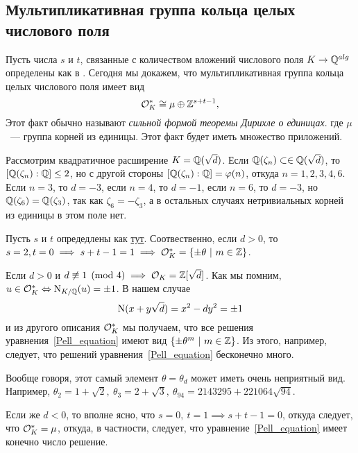 	
	\subsection{Мультипликативная группа кольца целых числового поля}

	Пусть числа $s$ и $t$, связанные с количеством вложений числового поля $K \to \mathbb{Q}^{alg}$ определены как в \hyperlink{real_and_complex_inclusions}{}. Сегодня мы докажем, что мультипликативная группа кольца целых числового поля имеет вид 
	\[
		\mathcal{O}_{K}^{*} \cong \mu \oplus \mathbb{Z}^{s + t - 1},
	\]
	Этот факт обычно называют \emph{сильной формой теоремы Дирихле о единицах}.
	где $\mu$~--- группа корней из единицы. Этот факт будет иметь множество приложений. 

	\begin{example}
		Рассмотрим квадратичное расширение $K = \mathbb{Q}(\sqrt{d})$. Если $\mathbb{Q}(\zeta_n) \subset \in \mathbb{Q}(\sqrt{d})$, то $[\mathbb{Q}(\zeta_n) : \mathbb{Q}] \le 2$, но с другой стороны $[\mathbb{Q}(\zeta_n) : \mathbb{Q}] = \varphi(n)$, откуда $n = 1, 2, 3, 4, 6$.  Если $n = 3$, то $d = -3$, если $n = 4$, то $d = -1$, если $n = 6$, то $d = -3$, но $\mathbb{Q}(\zeta_6) = \mathbb{Q}(\zeta_3)$, так как $\zeta_6 = -\zeta_3$, а в остальных случаях нетривиальных корней из единицы в этом поле нет. 

		Пусть $s$ и $t$ опредедлены как \hyperlink{real_and_complex_inclusions}{тут}. Соотвественно, если $d > 0$, то $s = 2, t = 0 \implies s + t - 1 = 1 \implies \mathcal{O}_{K}^{*} = \{ \pm \theta \ \vert \ m \in \mathbb{Z}\}$.

		Если $d > 0$ и $d \not\equiv 1 \pmod{4} \implies \mathcal{O}_{K} = \mathbb{Z}[\sqrt{d}]$. Как мы помним, $u \in \mathcal{O}_{K}^{*} \Leftrightarrow \operatorname{\mathrm{N}}_{K/\mathbb{Q}}(u) = \pm 1$. В нашем случае 
		\begin{equation}
			\operatorname{\mathrm{N}}(x + y\sqrt{d}) = x^2 - dy^2 = \pm 1 \label{Pell_equation}
		\end{equation}
		и из другого описания $\mathcal{O}_{K}^{*}$ мы получаем, что все решения уравнения~\eqref{Pell_equation} имеют вид $\{ \pm \theta^{m} \ \vert \ m \in \mathbb{Z} \}$. Из этого, например, следует, что решений уравнения~\eqref{Pell_equation} бесконечно много. 

		Вообще говоря, этот самый элемент $\theta = \theta_{d}$ может иметь очень неприятный вид. Например, $\theta_2 = 1 + \sqrt{2}, \ \theta_3 = 2 + \sqrt{3}, \ \theta_{94} = 2143295 + 221064\sqrt{94}$.

		Если же $d < 0$, то вполне ясно, что $s = 0, \ t = 1 \implies s + t - 1 = 0$, откуда следует, что $\mathcal{O}_{K}^{*} = \mu$, откуда, в частности, следует, что уравнение~\eqref{Pell_equation} имеет конечно число решение.
	\end{example}

